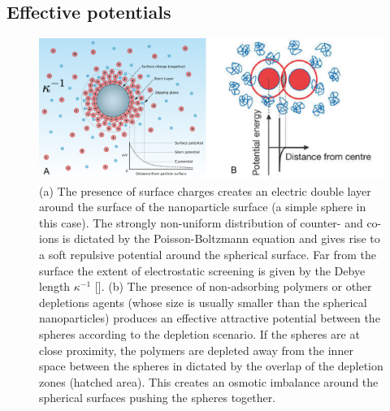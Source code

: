 \documentclass[amssymb]{revtex4}
\begin{document}
\subsection{Effective  potentials}

\begin{figure}
\begin{center}
\includegraphics[width= 0.8 \columnwidth]{pomf}
\caption{ \label{introfig4} (a) The presence of surface charges creates an electric double layer around the surface of the nanoparticle surface (a simple sphere in this case). The strongly non-uniform distribution of counter- and co-ions is dictated by the Poisson-Boltzmann equation and gives rise to a soft repulsive potential around the spherical surface. Far from the surface the extent of electrostatic screening is given by the Debye length $\kappa^{-1}$ []. (b) The presence of non-adsorbing polymers or other depletions agents (whose size is usually smaller than the spherical nanoparticles) produces an effective attractive potential between the spheres according to the depletion scenario. If the spheres are at close proximity, the polymers are depleted away from the inner space between the spheres in dictated by the overlap of the depletion zones (hatched area). This creates an osmotic imbalance around the spherical surfaces pushing the spheres together.  }
\end{center}
\end{figure}
\end{document}
